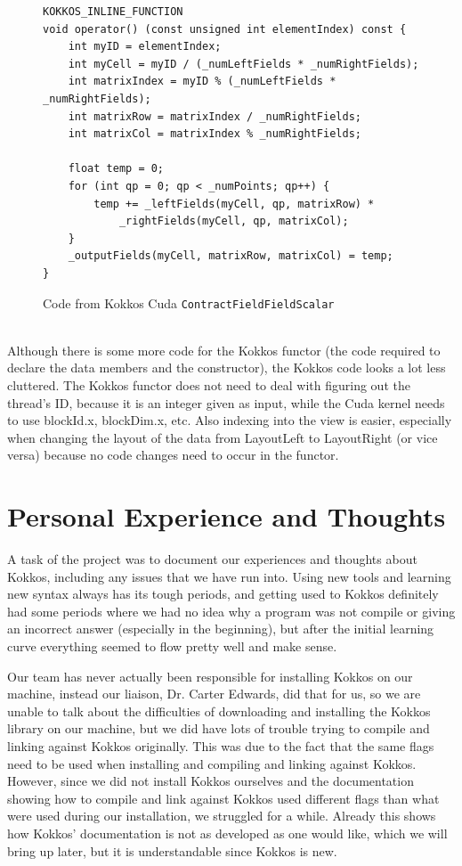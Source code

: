 \begin{figure}[htb]
	\begin{lstlisting}
KOKKOS_INLINE_FUNCTION
void operator() (const unsigned int elementIndex) const {
	int myID = elementIndex;
	int myCell = myID / (_numLeftFields * _numRightFields);
	int matrixIndex = myID % (_numLeftFields * _numRightFields);
	int matrixRow = matrixIndex / _numRightFields;
	int matrixCol = matrixIndex % _numRightFields;

	float temp = 0;
	for (int qp = 0; qp < _numPoints; qp++) {
		temp += _leftFields(myCell, qp, matrixRow) *
			_rightFields(myCell, qp, matrixCol);
	}
	_outputFields(myCell, matrixRow, matrixCol) = temp;
}
	\end{lstlisting}
\caption{Code from Kokkos Cuda \texttt{ContractFieldFieldScalar}
\label{lst:ContractFieldFieldScalar Kokkos Cuda functor}}
\end{figure}
\\
Although there is some more code for the Kokkos functor (the code required to
declare the data members and the constructor), the Kokkos code looks a lot less
cluttered. The Kokkos functor does not need to deal with figuring out the
thread's ID, because it is an integer given as input, while the Cuda kernel
needs to use blockId.x, blockDim.x, etc. Also indexing into the view is easier,
especially when changing the layout of the data from LayoutLeft to LayoutRight
(or vice versa) because no code changes need to occur in the functor.


\section{Personal Experience and Thoughts}
% 
A task of the project was to document our experiences and thoughts about Kokkos, including any issues that we have run into. Using new tools and learning new syntax always has its tough periods, and getting used to Kokkos definitely had some periods where we had no idea why a program was not compile or giving an incorrect answer (especially in the beginning), but after the initial learning curve everything seemed to flow pretty well and make sense. 

Our team has never actually been responsible for installing Kokkos on our machine, instead our liaison, Dr. Carter Edwards, did that for us, so we are unable to talk about the difficulties of downloading and installing the Kokkos library on our machine, but we did have lots of trouble trying to compile and linking against Kokkos originally. This was due to the fact that the same flags need to be used when installing and compiling and linking against Kokkos. However, since we did not install Kokkos ourselves and the documentation showing how to compile and link against Kokkos used different flags than what were used during our installation, we struggled for a while. Already this shows how Kokkos' documentation is not as developed as one would like, which we will bring up later, but it is understandable since Kokkos is new. 

